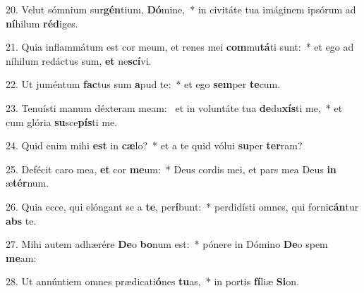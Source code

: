 20. Velut sómnium sur\textbf{gén}tium, \textbf{Dó}mine,~*  in civitáte tua imáginem ipsórum ad \textbf{ní}hilum \textbf{réd}iges.\

21. Quia inflammátum est cor meum, et renes mei \textbf{com}mu\textbf{tá}ti sunt:~*  et ego ad níhilum redáctus sum, \textbf{et} ne\textbf{scí}vi.\

22. Ut juméntum \textbf{fac}tus sum \textbf{a}pud te:~*  et ego \textbf{sem}per \textbf{te}cum.\

23. Tenuísti manum déxteram meam: \dag\  et in voluntáte tua \textbf{de}du\textbf{xís}ti me,~*  et cum glória \textbf{su}sce\textbf{pís}ti me.\

24. Quid enim mihi \textbf{est} in \textbf{cæ}lo?~*  et a te quid vólui \textbf{su}per \textbf{ter}ram?\

25. Defécit caro mea, \textbf{et} cor \textbf{me}um:~*  Deus cordis mei, et pars mea Deus \textbf{in} æ\textbf{tér}num.\

26. Quia ecce, qui elóngant se a \textbf{te}, per\textbf{í}bunt:~*  perdidísti omnes, qui forni\textbf{cán}tur \textbf{abs} te.\

27. Mihi autem adhærére \textbf{De}o \textbf{bo}num est:~*  pónere in Dómino \textbf{De}o spem \textbf{me}am:\

28. Ut annúntiem omnes prædicati\textbf{ó}nes \textbf{tu}as,~*  in portis \textbf{fí}liæ \textbf{Si}on.\

